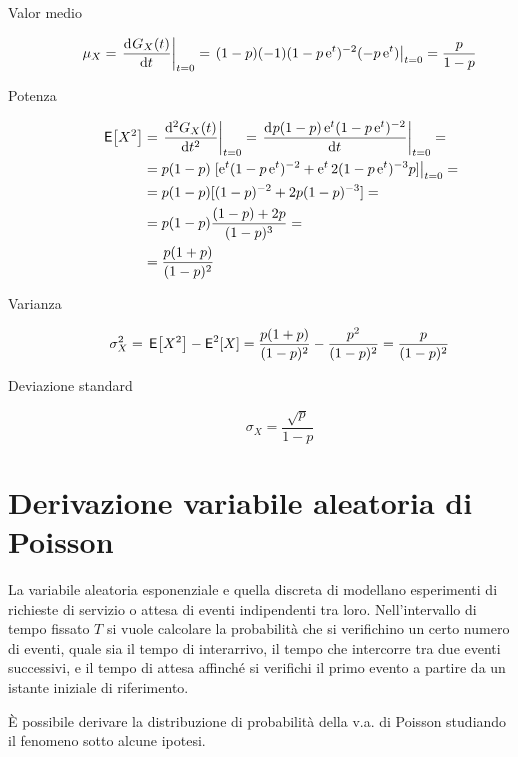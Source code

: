 \begin{description}
\item[Valor medio]
\begin{equation}
\mu_X=\restrict{\deriv{G_X(t)}{t}}{t=0}=\restrict{(1-p)(-1)(1-p\e{t})^{-2}(-p\e{t})}{t=0}=\frac{p}{1-p}
\end{equation}
\item[Potenza]
\begin{equation}
\begin{split}
\E{X^2}&=\restrict{\deriv[2]{G_X(t)}{t}}{t=0}=\restrict{\deriv{p(1-p)\e{t}(1-p\e{t})^{-2}}{t}}{t=0}=\\
&=p(1-p)\restrict{[\e{t}(1-p\e{t})^{-2}+\e{t}2(1-p\e{t})^{-3}p]}{t=0}=\\
&=p(1-p)[(1-p)^{-2}+2p(1-p)^{-3}]=\\
&=p(1-p)\frac{(1-p)+2p}{(1-p)^3}=\\
&=\frac{p(1+p)}{(1-p)^2}
\end{split}
\end{equation}
\item[Varianza]
\begin{equation}
\sigma^2_X=\E{X^2}-\Esp^2[X]=\frac{p(1+p)}{(1-p)^2}-\frac{p^2}{(1-p)^2}=\frac{p}{(1-p)^2}
\end{equation}
\item[Deviazione standard]
\begin{equation}
\sigma_X=\frac{\sqrt{p}}{1-p}
\end{equation}
\end{description}

\section{Derivazione variabile aleatoria di Poisson}
La variabile aleatoria esponenziale e quella discreta di  modellano esperimenti di richieste di servizio o attesa di eventi indipendenti tra loro. Nell'intervallo di tempo fissato $T$ si vuole calcolare la probabilità che si verifichino un certo numero di eventi, quale sia il tempo di interarrivo, il tempo che intercorre tra due eventi successivi, e il tempo di attesa affinché si verifichi il primo evento a partire da un istante iniziale di riferimento.

\`{E} possibile derivare la distribuzione di probabilità della v.a. di Poisson studiando il fenomeno sotto alcune ipotesi.

